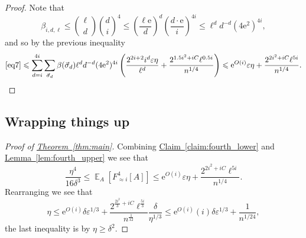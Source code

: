 \documentclass[11pt]{article}
\newcommand{\expref}[2]{\texorpdfstring{\hyperref[#2]{#1~\ref{#2}}}{#1~\ref{#2}}}
\newcommand{\eee}{\mathrm e}
\newcommand\Expect[2]{{\mathop{\mathbb{E}}_{#1}\left[ {#2} \right]}}
\newcommand\eps{\varepsilon}
\renewcommand\geq{\geqslant}
\renewcommand\leq{\leqslant}
\newcommand\expp[1]{\eee^{O({#1})}}
\newcommand\approxlvlfn[2]{{#1}_{\approx{#2}}}
\begin{document}
\begin{proof}
Note that
\[
\beta_{i,d,\ell}
\leq {\ell \choose d} {d \choose i}^4
\leq \left(\frac{\ell \eee}{d}\right)^{d}\left(\frac{d\cdot \eee}{i}\right)^{4i}
\leq \ell^d d^{-d} (4\eee^2)^{4i},
\]
and so by the previous inequality
\begin{align*}
\eqref{eq7}
\leq \sum\limits_{d=i}^{4i}{
\sum\limits_{\vec{\sigma}_d}{
\beta(\vec{\sigma}_d)\ell^d d^{-d} (4\eee^2)^{4i} \left(
\frac{2^{2i+2} i^{d} \eps\eta}{\ell^{d}}+\frac{2^{1.5i^2+iC} \ell^{0.5i}}{n^{1/4}}
\right)
}}
\leq \expp{i} \eps\eta + \frac{2^{2i^2+iC} \ell^{5i}}{n^{1/4}}.
\end{align*}
\end{proof}


\subsection{Wrapping things up}
\begin{proof}[Proof of \expref{Theorem}{thm:main}]
Combining \expref{Claim}{claim:fourth_lower} and \expref{Lemma}{lem:fourth_upper} we see that
\[
\frac{\eta^4}{16\delta^3} \leq \Expect{A}{\approxlvlfn{F}{i}^4[A]}
\leq  \expp{i} \eps\eta+ \frac{2^{2i^2+iC} \ell^{5i}}{n^{1/4}}.
\]
Rearranging we see that
\[
\eta
\leq \expp{i} \delta\eps^{1/3} + \frac{2^{\frac{2i^2}{3}+iC} \ell^{\frac{5i}{3}}}{n^{\frac{1}{12}}}\frac{\delta}{\eta^{1/3}}
\leq  \expp{i}(i) \delta\eps^{1/3} + \frac{1}{n^{1/24}},
\]
the last inequality is by $\eta\geq \delta^2$.
\end{proof}
\end{document}
